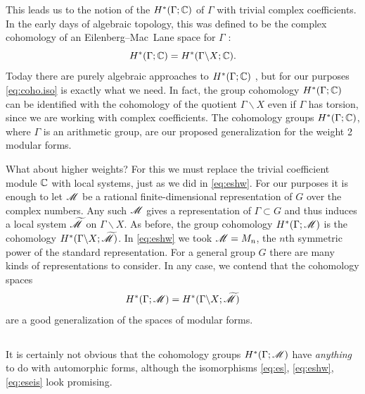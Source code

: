 This leads us to the notion of the  $H^{*}
(\Gamma ; \mathbb{C})$ of $\Gamma$ with trivial complex coefficients.  In the
early days of algebraic topology, this was defined to be the complex
cohomology of an Eilenberg--Mac~Lane space for $\Gamma$
\cite[Introduction, I.4]{brown}:
\begin{equation}\label{eq:coho.iso}
H^{*} (\Gamma ;\mathbb{C}) = H^{*} (\Gamma \backslash X; \mathbb{C}).
\end{equation}
Today there are purely algebraic approaches to $H^{*} (\Gamma ;\mathbb{C})$
\cite[III.1]{brown}, but for our purposes \eqref{eq:coho.iso} is
exactly what we need.  In fact, the group cohomology $H^{*} (\Gamma ;
\mathbb{C})$ can be identified with the cohomology of the quotient $\Gamma
\backslash X$ even if $\Gamma$ has torsion, since we are working with
complex coefficients.  The cohomology groups $H^{*} (\Gamma ; \mathbb{C})$,
where $\Gamma$ is an arithmetic group, are our proposed generalization
for the weight 2 modular forms.

What about higher weights?  For this we must replace the trivial
coefficient module $\mathbb{C}$ with local systems, just as we did in
\eqref{eq:eshw}.  For our purposes it is enough to let $\mathscr M$ be a
rational finite-dimensional representation of $G$ over the complex
numbers.  Any such $\mathscr M$ gives a representation of $\Gamma \subset
G$ and thus induces a local system $\widetilde{\mathscr M}$ on $\Gamma
\backslash X$.  As before, the group cohomology $H^{*} (\Gamma ;
\mathscr M)$ is the cohomology $H^{*} (\Gamma\backslash X;
\widetilde{\mathscr M})$.  In \eqref{eq:eshw} we took $\mathscr M =M_{n}$, the
$n$th symmetric power of the standard representation.  For a general
group $G$ there are many kinds of representations to consider.  In any
case, we contend that the cohomology spaces
\[
H^{*} (\Gamma ; \mathscr M) =  H^{*}(\Gamma \backslash X; \widetilde{\mathscr M}) 
\]
are a good generalization of the spaces of modular forms.

\subsection{}\label{ss:franke}
%
It is certainly not obvious that the cohomology groups $H^{*} (\Gamma
; \mathscr M)$ have \emph{anything} to do with automorphic forms, although
the isomorphisms \eqref{eq:es}, \eqref{eq:eshw}, \eqref{eq:eseis} look
promising.  

